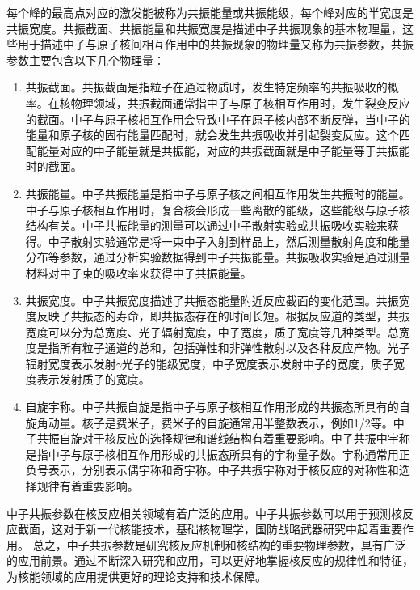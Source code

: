 每个峰的最高点对应的激发能被称为共振能量或共振能级，每个峰对应的半宽度是共振宽度。共振截面、共振能量和共振宽度是描述中子共振现象的基本物理量，这些用于描述中子与原子核间相互作用中的共振现象的物理量又称为共振参数，共振参数主要包含以下几个物理量：
\begin{enumerate}[(1)]
  \item 共振截面。共振截面是指粒子在通过物质时，发生特定频率的共振吸收的概率。在核物理领域，共振截面通常指中子与原子核相互作用时，发生裂变反应的截面。中子与原子核相互作用会导致中子在原子核内部不断反弹，当中子的能量和原子核的固有能量匹配时，就会发生共振吸收并引起裂变反应。这个匹配能量对应的中子能量就是共振能，对应的共振截面就是中子能量等于共振能时的截面。
	\item 共振能量。中子共振能量是指中子与原子核之间相互作用发生共振时的能量\cite{cierjacks1980high}。中子与原子核相互作用时，复合核会形成一些离散的能级，这些能级与原子核结构有关。中子共振能量的测量可以通过中子散射实验或共振吸收实验来获得。中子散射实验通常是将一束中子入射到样品上，然后测量散射角度和能量分布等参数，通过分析实验数据得到中子共振能量。共振吸收实验是通过测量材料对中子束的吸收率来获得中子共振能量。
	\item 共振宽度。中子共振宽度描述了共振态能量附近反应截面的变化范围。共振宽度反映了共振态的寿命，即共振态存在的时间长短。根据反应道的类型，共振宽度可以分为总宽度、光子辐射宽度，中子宽度，质子宽度等几种类型。总宽度是指所有粒子通道的总和，包括弹性和非弹性散射以及各种反应产物。光子辐射宽度表示发射$\gamma$光子的能级宽度，中子宽度表示发射中子的宽度，质子宽度表示发射质子的宽度。
    \item 自旋宇称。中子共振自旋是指中子与原子核相互作用形成的共振态所具有的自旋角动量\cite{hore2015nuclear}。核子是费米子，费米子的自旋通常用半整数表示，例如1/2等。中子共振自旋对于核反应的选择规律和谱线结构有着重要影响。中子共振中宇称是指中子与原子核相互作用形成的共振态所具有的宇称量子数。宇称通常用正负号表示，分别表示偶宇称和奇宇称。中子共振宇称对于核反应的对称性和选择规律有着重要影响。
\end{enumerate}

中子共振参数在核反应相关领域有着广泛的应用。中子共振参数可以用于预测核反应截面\cite{seidl1949interpretation}，这对于新一代核能技术，基础核物理学，国防战略武器研究\cite{郭之虞2003核技术及其应用的发展}中起着重要作用。
总之，中子共振参数是研究核反应机制和核结构的重要物理参数，具有广泛的应用前景。通过不断深入研究和应用，可以更好地掌握核反应的规律性和特征，为核能领域的应用提供更好的理论支持和技术保障。

